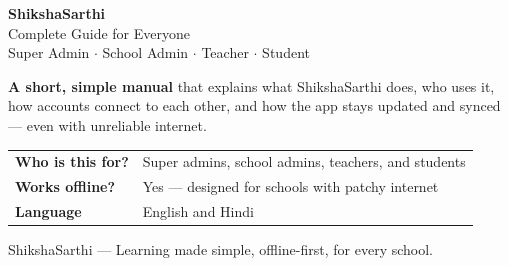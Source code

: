 \documentclass[12pt,a4paper]{article}
\begin{document}
\pagecolor{pageBg}

\begin{titlepage}
\pagecolor{white}

\vspace*{2.1cm}
\hspace{1.6cm}
\begin{minipage}{15cm}
{\color{white}\fontsize{44}{48}\selectfont\bfseries ShikshaSarthi}\\[0.3cm]
{\color{white}\Large Complete Guide for Everyone}\\[0.15cm]
{\color{white!85!black}\large Super Admin \(\cdot\) School Admin \(\cdot\) Teacher \(\cdot\) Student}
\end{minipage}

\vspace{2.3cm}
\hspace{1.6cm}
\begin{minipage}{14.5cm}
\begin{tcolorbox}[colback=white, colframe=eduBlue, boxrule=1.2pt, arc=3mm,
  left=5mm, right=5mm, top=3mm, bottom=3mm]
{\large\bfseries A short, simple manual} that explains what ShikshaSarthi does,
who uses it, how accounts connect to each other, and how the app stays updated
and synced --- even with unreliable internet.
\end{tcolorbox}
\end{minipage}

\vspace{1.4cm}
\hspace{1.6cm}
\begin{minipage}{14.5cm}
\renewcommand{\arraystretch}{1.5}
\begin{tabularx}{\linewidth}{@{}l X@{}}
\textbf{\textcolor{eduBlue}{Who is this for?}} & Super admins, school admins, teachers, and students \\
\textbf{\textcolor{eduGreen}{Works offline?}} & Yes --- designed for schools with patchy internet \\
\textbf{\textcolor{eduPurple}{Language}} & English and Hindi \\
\end{tabularx}
\end{minipage}

\vfill
\begin{center}
{\color{softGray}\small ShikshaSarthi --- Learning made simple, offline-first, for every school.}
\end{center}
\vspace{1cm}
\end{titlepage}
\restoregeometry
\pagecolor{pageBg}
\end{document}
